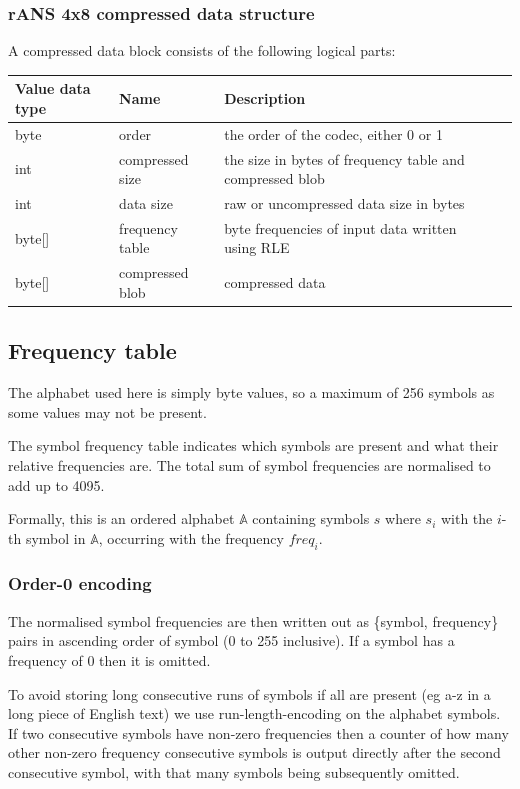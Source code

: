 \documentclass[a4paper]{article}
\begin{document}
\subsubsection*{\textbf{rANS 4x8 compressed data structure}}
A compressed data block consists of the following logical parts:

\begin{tabular}{|l|l|>{\raggedright}p{100pt}|>{\raggedright}p{220pt}|}
\hline
\textbf{Value data type} & \textbf{Name} & \textbf{Description}\tabularnewline
\hline
byte & order & the order of the codec, either 0 or 1\tabularnewline
\hline
int & compressed size & the size in bytes of frequency table and compressed blob\tabularnewline
\hline
int & data size & raw or uncompressed data size in bytes\tabularnewline
\hline
byte[] & frequency table & byte frequencies of input data written using RLE\tabularnewline
\hline
byte[] & compressed blob & compressed data\tabularnewline
\hline
\end{tabular}

\subsection{\textbf{Frequency table}}

The alphabet used here is simply byte values, so a maximum of 256
symbols as some values may not be present.

The symbol frequency table indicates which symbols are present and
what their relative frequencies are.  The total sum of symbol
frequencies are normalised to add up to 4095.

Formally, this is an ordered alphabet $\mathbb{A}$ containing symbols $s$ where
$s_{i}$ with the $i$-th symbol in $\mathbb{A}$, occurring with the frequency $freq_{i}$.

\subsubsection*{Order-0 encoding}

The normalised symbol frequencies are then written out as \{symbol,
frequency\} pairs in ascending order of symbol (0 to 255 inclusive).
If a symbol has a frequency of 0 then it is omitted.

To avoid storing long consecutive runs of symbols if all are present
(eg a-z in a long piece of English text) we use run-length-encoding on
the alphabet symbols.  If two consecutive symbols have non-zero
frequencies then a counter of how many other non-zero frequency
consecutive symbols is output directly after the second consecutive
symbol, with that many symbols being subsequently omitted.
\end{document}
